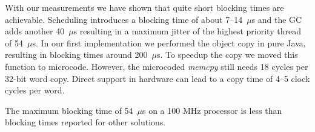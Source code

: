 With our measurements we have shown that quite short blocking times
are achievable. Scheduling introduces a blocking time of about
7--14~$\mu$s and the GC adds another 40~$\mu$s resulting in a
maximum jitter of the highest priority thread of 54~$\mu$s. In our
first implementation we performed the object copy in pure Java,
resulting in blocking times around 200~$\mu$s. To speedup the copy
we moved this function to microcode. However, the microcoded
\emph{memcpy} still needs 18 cycles per 32-bit word copy. Direct
support in hardware can lead to a copy time of 4--5 clock cycles per
word.

The maximum blocking time of 54~$\mu$s on a 100 MHz processor is less than
blocking times reported for other solutions.








